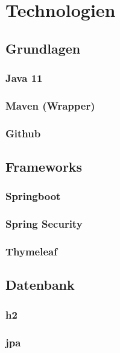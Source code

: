 

\section{Technologien}
\label{Technologien}


\subsection{Grundlagen}

\subsubsection{Java 11}

\subsubsection{Maven (Wrapper)}

\subsubsection{Github}


\subsection{Frameworks}

\subsubsection{Springboot}

\subsubsection{Spring Security}

\subsubsection{Thymeleaf}


\subsection{Datenbank}
\subsubsection{h2}
\subsubsection{jpa}


